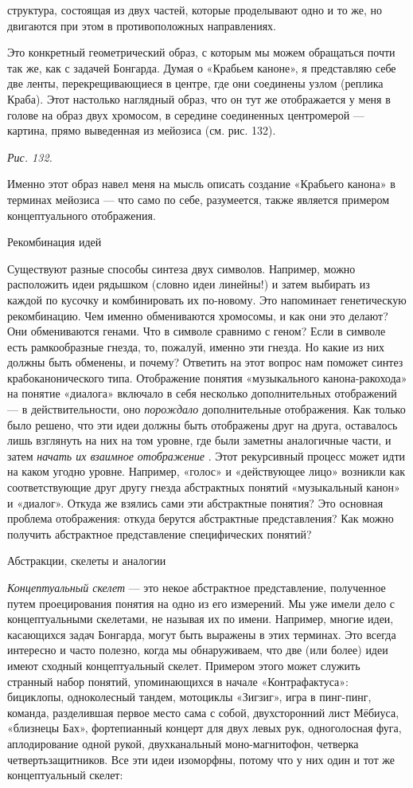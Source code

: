 \documentclass[../main.tex]{subfiles}
\begin{document}
структура, состоящая из двух частей, которые проделывают одно и то же, но двигаются при этом в противоположных направлениях.

Это конкретный геометрический образ, с которым мы можем обращаться почти так же, как с задачей Бонгарда. Думая о «Крабьем каноне», я представляю себе две ленты, перекрещивающиеся в центре, где они соединены узлом (реплика Краба). Этот настолько наглядный образ, что он тут же отображается у меня в голове на образ двух хромосом, в середине соединенных центромерой --- картина, прямо выведенная из мейозиса (см. рис. 132).

\emph{Рис. 132.}

Именно этот образ навел меня на мысль описать создание «Крабьего канона» в терминах мейозиса --- что само по себе, разумеется, также является примером концептуального отображения.

Рекомбинация идей

Существуют разные способы синтеза двух символов. Например, можно расположить идеи рядышком (словно идеи линейны!) и затем выбирать из каждой по кусочку и комбинировать их по-новому. Это напоминает генетическую рекомбинацию. Чем именно обмениваются хромосомы, и как они это делают? Они обмениваются генами. Что в символе сравнимо с геном? Если в символе есть рамкообразные гнезда, то, пожалуй, именно эти гнезда. Но какие из них должны быть обменены, и почему? Ответить на этот вопрос нам поможет синтез крабоканонического типа. Отображение понятия «музыкального канона-ракохода» на понятие «диалога» включало в себя несколько дополнительных отображений --- в действительности, оно \emph{порождало} дополнительные отображения. Как только было решено, что эти идеи должны быть отображены друг на друга, оставалось лишь взглянуть на них на том уровне, где были заметны аналогичные части, и затем \emph{начать их взаимное отображение} . Этот рекурсивный процесс может идти на каком угодно уровне. Например, «голос» и «действующее лицо» возникли как соответствующие друг другу гнезда абстрактных понятий «музыкальный канон» и «диалог». Откуда же взялись сами эти абстрактные понятия? Это основная проблема отображения: откуда берутся абстрактные представления? Как можно получить абстрактное представление специфических понятий?

Абстракции, скелеты и аналогии

\emph{Концептуальный скелет} --- это некое абстрактное представление, полученное путем проецирования понятия на одно из его измерений. Мы уже имели дело с концептуальными скелетами, не называя их по имени. Например, многие идеи, касающихся задач Бонгарда, могут быть выражены в этих терминах. Это всегда интересно и часто полезно, когда мы обнаруживаем, что две (или более) идеи имеют сходный концептуальный скелет. Примером этого может служить странный набор понятий, упоминающихся в начале «Контрафактуса»: бициклопы, одноколесный тандем, мотоциклы «Зигзиг», игра в пинг-пинг, команда, разделившая первое место сама с собой, двухсторонний лист Мёбиуса, «близнецы Бах», фортепианный концерт для двух левых рук, одноголосная фуга, аплодирование одной рукой, двухканальный моно-магнитофон, четверка четвертьзащитников. Все эти идеи изоморфны, потому что у них один и тот же концептуальный скелет:
\end{document}
